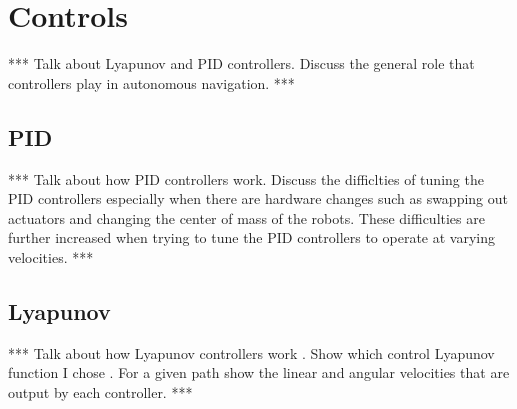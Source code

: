 \chapter{Controls}
\label{ch:controls}
*** Talk about Lyapunov and PID controllers. Discuss the general role that controllers play in autonomous navigation. ***

\section{PID}
\label{sec:pid}
*** Talk about how PID controllers work. Discuss the difficlties of tuning the PID controllers especially when there are hardware changes such as swapping out actuators and changing the center of mass of the robots. These difficulties are further increased when trying to tune the PID controllers to operate at varying velocities. ***

\section{Lyapunov}
\label{sec:lyapunov}
*** Talk about how Lyapunov controllers work \cite{Khalil02}. Show which control Lyapunov function I chose \cite{Rusu05RobotuxLyapunov}. For a given path show the linear and angular velocities that are output by each controller. ***